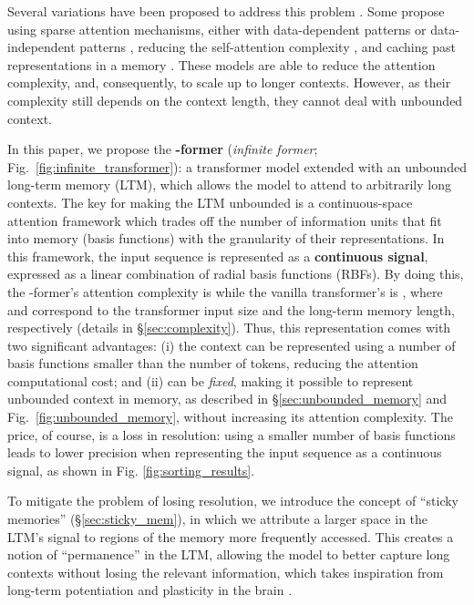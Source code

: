 \documentclass[11pt]{article}
\begin{document}
Several variations have been proposed to address this problem \citep{tay2020efficient}. Some propose using sparse attention mechanisms, either with data-dependent patterns \citep{kitaev2020reformer,vyas2020fast,tay2020sparse,roy2021efficient,wang2021cluster} or data-independent patterns \citep{child2019generating,beltagy2020longformer,zaheer2020big}, reducing the self-attention complexity \citep{katharopoulos2020transformers,choromanski2020rethinking,peng2021random,jaegle2021perceiver}, and caching past representations in a memory \citep{dai2019transformer,rae2019compressive}. 
These models are able to reduce the attention complexity, and, consequently, to scale up to longer contexts. However, as their complexity still depends on the context length, they cannot deal with unbounded context.

In this paper, we propose the \textbf{\mbox{-former}} (\emph{infinite former}; Fig.~\ref{fig:infinite_transformer}): a transformer model extended with an unbounded long-term memory (LTM), which allows the model to attend to arbitrarily long contexts. 
The key for making the LTM unbounded is a continuous-space attention framework \citep{martins2020sparse} which trades off the number of information units that fit into memory (basis functions) with the granularity of their representations. 
In this framework, the input sequence is represented as a \textbf{continuous signal}, expressed as a linear combination of  radial basis functions (RBFs). By doing this, the \mbox{-former}'s attention complexity is  while the vanilla transformer's is , where  and  correspond to the transformer input size and the long-term memory length, respectively (details in \S\ref{sec:complexity}).
Thus, this representation comes with two significant advantages: (i) the context can be represented using a number of basis functions  smaller than the number of tokens, reducing the attention computational cost; and (ii)  can be \textit{fixed}, making it possible to represent unbounded context in memory, as described in \S\ref{sec:unbounded_memory} and Fig.~\ref{fig:unbounded_memory}, without increasing its attention complexity. 
The price, of course, is a loss in resolution: using a smaller number of basis functions leads to lower precision when representing the input sequence as a continuous signal, as shown in Fig. \ref{fig:sorting_results}.

To mitigate the problem of losing resolution, we introduce the concept of ``sticky memories'' (\S\ref{sec:sticky_mem}), in which we attribute a larger space in the LTM's signal to regions of the memory more frequently accessed. This creates a notion of ``permanence'' in the LTM, allowing the model to better capture long contexts without losing the relevant information,  which takes inspiration from long-term potentiation and plasticity in the brain \citep{mills2014cognitive,bamji2005cadherins}.
\end{document}
